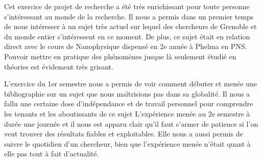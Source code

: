 Cet exercice de projet de recherche a été très enrichissant pour toute personne s'intéressant au monde de la recherche. Il nous a permis dans un premier temps de nous intéresser à un sujet très actuel sur lequel des chercheurs de Grenoble et du monde entier s'intéressent en ce moment. De plus, ce sujet était en relation direct avec le cours de Nanophysique dispensé en 2e année à Phelma en PNS. Pouvoir mettre en pratique des phénomènes jusque là seulement étudié en théories est évidement très grisant.

L'exercice du 1er semestre nous a permis de voir comment débuter et menée une bibliographie sur un sujet que nous maîtrisions pas dans sa globalité. Il nous a fallu une certaine dose d'indépendance et de travail personnel pour comprendre les tenants et les aboutissants de ce sujet
L'expérience menée au 2e semestre à durée une journée et il nous est apparu clair qu'il faut s'armer de patience si l'on veut trouver des résultats fiables et exploitables. Elle nous a aussi permis de suivre le quotidien d'un chercheur, bien que l'expérience menée n'était quant à elle pas tout à fait d'actualité.
